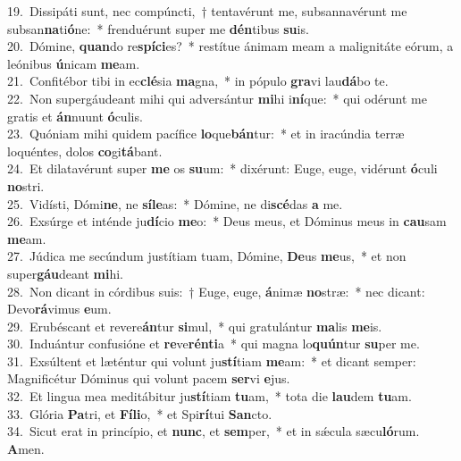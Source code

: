 {19.~}Dissipáti sunt, nec compúncti,~† tentavérunt me, subsannavérunt me subsan\textbf{na}ti\textbf{ó}ne:~* frenduérunt super me \textbf{dén}tibus \textbf{su}is.\\
{20.~}Dómine, \textbf{quan}do re\textbf{spí}\textbf{ci}es?~* restítue ánimam meam a malignitáte eórum, a leónibus \textbf{ú}nicam \textbf{me}am.\\
{21.~}Confitébor tibi in ec\textbf{clé}sia \textbf{ma}gna,~* in pópulo \textbf{gra}vi lau\textbf{dá}bo te.\\
{22.~}Non supergáudeant mihi qui adversántur \textbf{mi}hi i\textbf{ní}que:~* qui odérunt me gratis et \textbf{án}nuunt \textbf{ó}culis.\\
{23.~}Quóniam mihi quidem pacífice \textbf{lo}que\textbf{bán}tur:~* et in iracúndia terræ loquéntes, dolos \textbf{co}gi\textbf{tá}bant.\\
{24.~}Et dilatavérunt super \textbf{me} os \textbf{su}um:~* dixérunt: Euge, euge, vidérunt \textbf{ó}culi \textbf{no}stri.\\
{25.~}Vidísti, Dómi\textbf{ne}, ne \textbf{sí}\textbf{le}as:~* Dómine, ne di\textbf{scé}das \textbf{a} me.\\
{26.~}Exsúrge et inténde ju\textbf{dí}cio \textbf{me}o:~* Deus meus, et Dóminus meus in \textbf{cau}sam \textbf{me}am.\\
{27.~}Júdica me secúndum justítiam tuam, Dómine, \textbf{De}us \textbf{me}us,~* et non super\textbf{gáu}deant \textbf{mi}hi.\\
{28.~}Non dicant in córdibus suis:~† Euge, euge, \textbf{á}nimæ \textbf{no}stræ:~* nec dicant: Devo\textbf{rá}vimus \textbf{e}um.\\
{29.~}Erubéscant et revere\textbf{án}tur \textbf{si}mul,~* qui gratulántur \textbf{ma}lis \textbf{me}is.\\
{30.~}Induántur confusióne et \textbf{re}ve\textbf{rén}\textbf{ti}a~* qui magna lo\textbf{quún}tur \textbf{su}per me.\\
{31.~}Exsúltent et læténtur qui volunt ju\textbf{stí}tiam \textbf{me}am:~* et dicant semper: Magnificétur Dóminus qui volunt pacem \textbf{ser}vi \textbf{e}jus.\\
{32.~}Et lingua mea meditábitur ju\textbf{stí}tiam \textbf{tu}am,~* tota die \textbf{lau}dem \textbf{tu}am.\\
{33.~}Glória \textbf{Pa}tri, et \textbf{Fí}\textbf{li}o,~* et Spi\textbf{rí}tui \textbf{San}cto.\\
{34.~}Sicut erat in princípio, et \textbf{nunc}, et \textbf{sem}per,~* et in sǽcula sæcu\textbf{ló}rum. \textbf{A}men.\\
